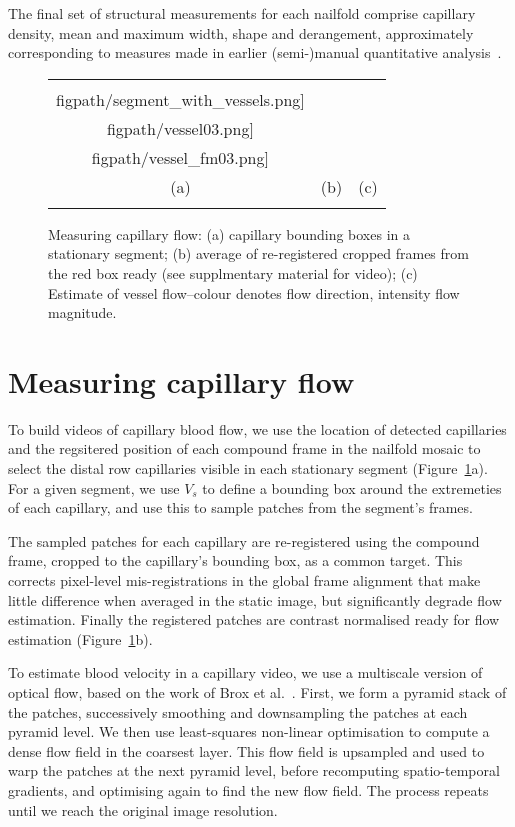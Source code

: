 \documentclass[runningheads,a4paper]{llncs}
\def\figpath{./figs}
\newcommand{\fref}[1]{Figure~\ref{#1}}
\def\figpath{./figs}
\begin{document}
The final set of structural measurements for each nailfold comprise capillary density, mean and maximum width, shape and derangement, approximately corresponding to measures made in earlier (semi-)manual quantitative analysis~\cite{Murray_etal_AR09}.
%
\begin{figure}[t]
\centering
\begin{tabular}{@{}c c c@{}}
\texttt{[image: \\figpath/segment\_with\_vessels.png]} &
\texttt{[image: \\figpath/vessel03.png]} &
\texttt{[image: \\figpath/vessel\_fm03.png]} \\
(a) & (b) & (c)\\
\noalign{\smallskip}
\end{tabular}
%
\caption{Measuring capillary flow: %
(a) capillary bounding boxes in a stationary segment; %
(b) average of re-registered cropped frames from the red box ready (see supplmentary material for video); %
(c) Estimate of vessel flow--colour denotes flow direction, intensity flow magnitude. %
}
\label{f:vessel_flow}
\end{figure}
%
\section{Measuring capillary flow}
\label{s:flow}
%
To build videos of capillary blood flow, we use the location of detected capillaries and the regsitered position of each compound frame in the nailfold mosaic to select the distal row capillaries visible in each stationary segment (\fref{f:vessel_flow}a). For a given segment, we use $V_s$ to define a bounding box around the extremeties of each capillary, and use this to sample patches from the segment's frames. 

The sampled patches for each capillary are re-registered using the compound frame, cropped to the capillary's bounding box, as a common target. This corrects pixel-level mis-registrations in the global frame alignment that make little difference when averaged in the static image, but significantly degrade flow estimation. Finally the registered patches are contrast normalised ready for flow estimation (\fref{f:vessel_flow}b).

To estimate blood velocity in a capillary video, we use a multiscale version of optical flow, based on the work of Brox et al.~\cite{BroxECCV04}. First, we form a pyramid stack of the patches, successively smoothing and downsampling the patches at each pyramid level. We then use least-squares non-linear optimisation to compute a dense flow field in the coarsest layer. This flow field is upsampled and used to warp the patches at the next pyramid level, before recomputing spatio-temporal gradients, and optimising again to find the new flow field. The process repeats until we reach the original image resolution.
\end{document}
